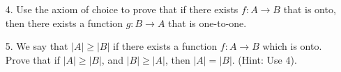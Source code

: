 \documentclass[10pt]{article}
\theoremstyle{definition}
\theoremstyle{plain}
\begin{document}
\pagebreak



\begin{enumerate}
\item[4.] Use the axiom of choice to prove that if there exists $f:A \to B$ that is onto, then there exists a function $g:B \to A$ that is one-to-one.
\end{enumerate}

\begin{enumerate}
\item[5.] We say that $|A| \geq |B|$ if there exists a function $f:A \to B$ which is onto.  Prove that if $|A| \geq |B|$, and $|B| \geq |A|$, then $|A| = |B|$.  (Hint:  Use 4).
\end{enumerate}
\end{document}
